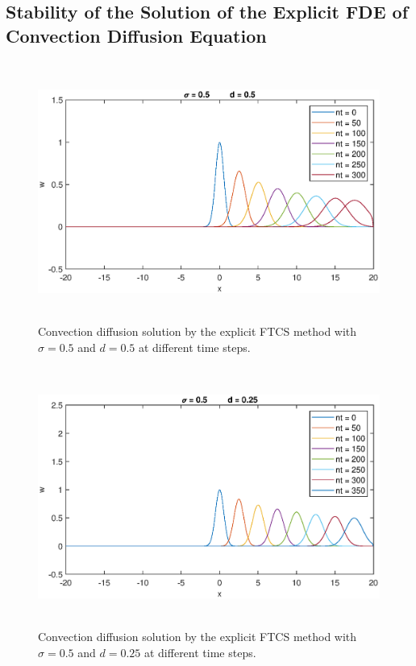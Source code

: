 \documentclass[letterpaper,12pt]{article}
\begin{document}
\subsection{Stability of the Solution of the Explicit FDE of Convection Diffusion Equation}
\begin{figure}[!ht] 
	\centering 
	\includegraphics[max height=8.5cm]{graphs/FTCS/ConvectionDiffusion/sigma05d05.eps}
	\caption{Convection diffusion solution by the explicit FTCS method with $\sigma= 0.5$ and $d=0.5$ at different time steps.}
 	\label{fig:FTCSsigma05d05}
\end{figure}
\begin{figure}[!ht] 
	\centering 
	\includegraphics[max height=8.5cm]{graphs/FTCS/ConvectionDiffusion/sigma05d025.eps}
	\caption{Convection diffusion solution by the explicit FTCS method with $\sigma= 0.5$ and $d=0.25$ at different time steps.}
	 \label{fig:FTCSsigma05d025}
\end{figure}
\newpage
\end{document}
